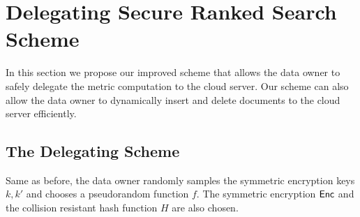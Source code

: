 \documentclass{IEEEtran}
\begin{document}
\section{Delegating Secure Ranked Search Scheme}
In this section we propose our improved scheme that allows the data owner to safely delegate the metric computation to the cloud server. Our scheme can also allow the data owner to dynamically insert and delete documents to the cloud server efficiently.

\subsection{The Delegating Scheme}
Same as before, the data owner randomly samples the symmetric encryption keys $k, k'$ and chooses a pseudorandom function $f$. The symmetric encryption $\textsf{Enc}$ and the collision resistant hash function $H$ are also chosen. 
\end{document}
